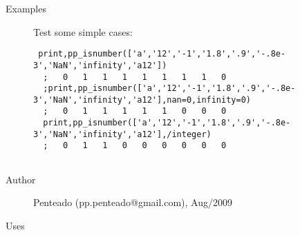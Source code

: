 \begin{description}
\item[Examples]\hspace*{0em} \newline  Test some simple cases:
 \begin{verbatim} print,pp_isnumber(['a','12','-1','1.8','.9','-.8e-3','NaN','infinity','a12'])
  ;   0   1   1   1   1   1   1   1   0
  ;print,pp_isnumber(['a','12','-1','1.8','.9','-.8e-3','NaN','infinity','a12'],nan=0,infinity=0)
  ;   0   1   1   1   1   1   0   0   0
  print,pp_isnumber(['a','12','-1','1.8','.9','-.8e-3','NaN','infinity','a12'],/integer)
  ;   0   1   1   0   0   0   0   0   0
 
 \end{verbatim}
 
\end{description}



\begin{description}

\item[Author]\hspace*{0em} \newlinePaulo Penteado (pp.penteado@gmail.com), Aug/2009









\end{description}



\begin{description}







\item[Uses]\hspace*{0em} \newline 
 









\end{description}




\vspace{0.5em}









